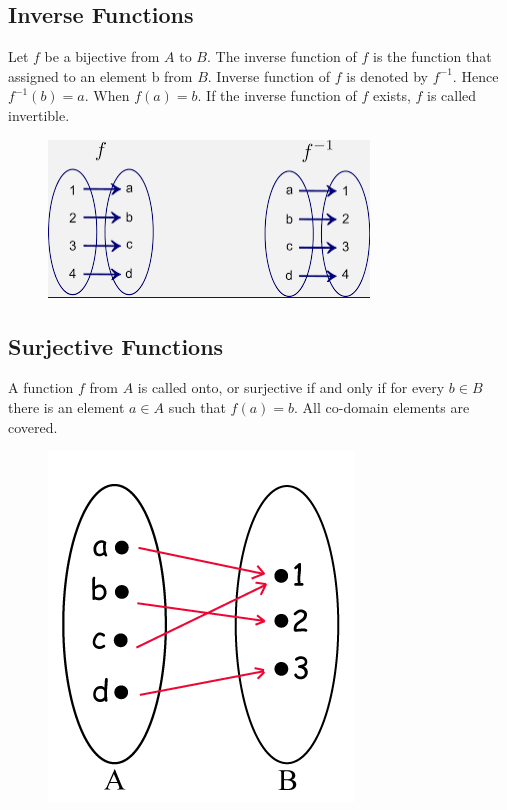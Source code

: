 \documentclass[12pt]{report}
\begin{document}
	\subsection{Inverse Functions}
	Let $f$ be a bijective from $A$ to $B$. The inverse function of $f$ is the function that assigned to an element b from $B$. Inverse function of $f$ is denoted by $f^{-1}$. Hence $f^{-1}(b) = a$. When $f(a)=b$. If the inverse function of $f$ exists, $f$ is called invertible.
		\begin{figure}[h!]
		\centering
		\includegraphics[width=0.35\linewidth]{inverse}
	\end{figure}
	
	
	\subsection{Surjective Functions}
	A function $f$ from $A$ is called onto, or surjective if and only if for every $b\in B$ there is an element $a\in A$ such that $f(a)=b$. All co-domain elements are covered.
	\begin{figure}[h!]
		\centering
		\includegraphics[width=0.3\linewidth]{surjective}
	\end{figure}
	
	
\end{document}
